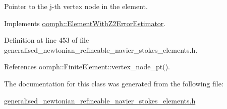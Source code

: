 Pointer to the j-\/th vertex node in the element. 



Implements \hyperlink{classoomph_1_1ElementWithZ2ErrorEstimator_a0eedccc33519f852c5dc2055ddf2774b}{oomph\+::\+Element\+With\+Z2\+Error\+Estimator}.



Definition at line 453 of file generalised\+\_\+newtonian\+\_\+refineable\+\_\+navier\+\_\+stokes\+\_\+elements.\+h.



References oomph\+::\+Finite\+Element\+::vertex\+\_\+node\+\_\+pt().



The documentation for this class was generated from the following file\+:\begin{DoxyCompactItemize}
\item 
\hyperlink{generalised__newtonian__refineable__navier__stokes__elements_8h}{generalised\+\_\+newtonian\+\_\+refineable\+\_\+navier\+\_\+stokes\+\_\+elements.\+h}\end{DoxyCompactItemize}
